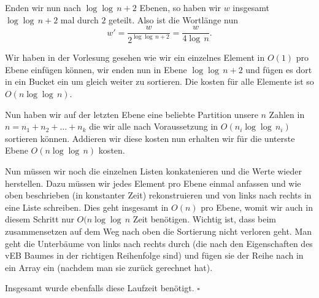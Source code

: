 \documentclass[11pt,a4paper,ngerman]{article}
\begin{document}
Enden wir nun nach $\log \log \, n + 2$ Ebenen, so haben wir  $w$ insgesamt $\log \log \, n + 2$ mal durch $2$ geteilt.
Also ist die Wortlänge nun
$$
	w' = \frac{w}{2^{\log \log \, n + 2}} = \frac{w}{4\log \,n}.
$$

Wir haben in der Vorlesung gesehen wie wir ein einzelnes Element in $O(1)$ pro Ebene einfügen können,  wir enden nun in Ebene $\log \log \, n +2$ und fügen es dort in ein Bucket ein um gleich weiter zu sortieren. Die kosten für alle Elemente ist so $O(n \log \log \, n)$.

Nun haben wir auf der letzten Ebene eine beliebte Partition unsere $n$ Zahlen in $n = n_1 + n_2 + \ldots + n_k$ die wir alle nach Voraussetzung in $O(n_i \log\log \, n_i)$ sortieren können.
Addieren wir diese kosten nun erhalten wir für die unterste Ebene $O(n \log \log \, n)$ kosten.

Nun müssen wir noch die einzelnen Listen konkatenieren und die Werte wieder herstellen. Dazu müssen wir jedes Element pro Ebene einmal anfassen und wie oben beschrieben (in konstanter Zeit) rekonstruieren und von links nach rechts in eine Liste schreiben. Dies geht insgesamt in $O(n)$ pro Ebene, womit wir auch in diesem Schritt nur $O(n \log \log \, n$ Zeit benötigen. Wichtig ist, dass beim zusammensetzen auf dem Weg nach oben die Sortierung nicht verloren geht. Man geht die Unterbäume von links nach rechts durch (die nach den Eigenschaften des vEB Baumes in der richtigen Reihenfolge sind) und fügen sie der Reihe nach in ein Array ein (nachdem man sie zurück gerechnet hat).

Insgesamt wurde ebenfalls diese Laufzeit benötigt.
\mbox{}\hfill$\square$
\label{LastPage}
\end{document}
